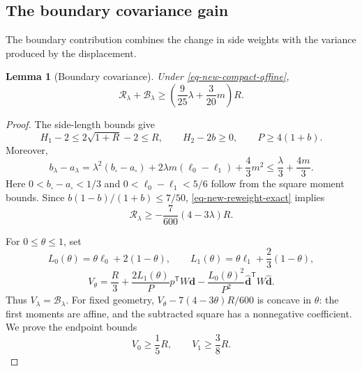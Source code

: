 \documentclass[11pt]{amsart}
\newtheorem{lemma}[theorem]{Lemma}
\theoremstyle{remark}\newtheorem{remark}[theorem]{Remark}
\numberwithin{equation}{section}
\begin{document}
\subsection{The boundary covariance gain}

The boundary contribution combines the change in side weights with the
variance produced by the displacement.
\begin{lemma}[Boundary covariance]\label{lem-new-combined-boundary}
Under \eqref{eq-new-compact-affine},
\[
\mathcal R_\lambda+\mathcal B_\lambda
\ge\left(\frac9{25}\lambda+\frac3{20}m\right)R.
\]
\end{lemma}
\begin{proof}
The side-length bounds give
\[
H_1-2\le2\sqrt{1+R}-2\le R,\qquad
H_2-2b\ge0,\qquad P\ge4(1+b).
\]
Moreover,
\[
b_\lambda-a_\lambda
=\lambda^2(b_\square-a_\square)
+2\lambda m(\ell_0-\ell_1)+\frac43m^2
\le\frac\lambda3+\frac{4m}{3}.
\]
Here $0<b_\square-a_\square<1/3$ and
$0<\ell_0-\ell_1<5/6$ follow from the square moment bounds.
Since $b(1-b)/(1+b)\le7/50$, \eqref{eq-new-reweight-exact} implies
\begin{equation}\label{eq-boundary-reweight-loss}
\mathcal R_\lambda\ge-\frac7{600}(4-3\lambda)R.
\end{equation}

For $0\le\theta\le1$, set
\[
L_0(\theta)=\theta\ell_0+2(1-\theta),\qquad
L_1(\theta)=\theta\ell_1+\frac23(1-\theta),
\]
\[
V_\theta=\frac R3+\frac{2L_1(\theta)}P
p^{\mathsf T}W\mathbf d
-\frac{L_0(\theta)^2}{P^2}
\widehat{\mathbf d}^{\mathsf T}W\widehat{\mathbf d}.
\]
Thus $V_\lambda=\mathcal B_\lambda$. For fixed geometry,
$V_\theta-7(4-3\theta)R/600$ is concave in $\theta$:
the first moments are affine, and the subtracted square has a
nonnegative coefficient. We prove the endpoint bounds
\begin{equation}\label{eq-boundary-endpoints}
V_0\ge\frac15R,\qquad V_1\ge\frac38R.
\end{equation}


\end{proof}
\end{document}
